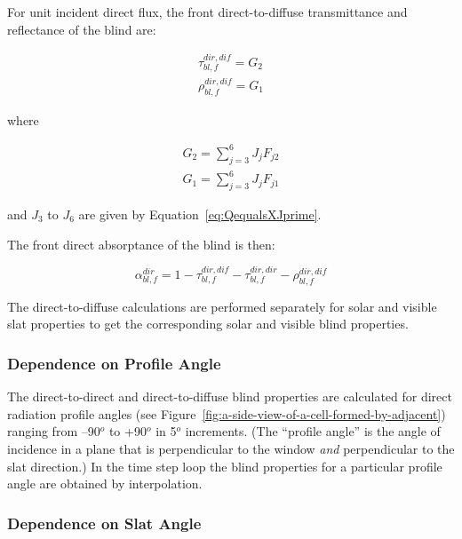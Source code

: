 For unit incident direct flux, the front direct-to-diffuse transmittance and reflectance of the blind are:

\begin{equation}
  \begin{array}{l}
    \tau_{bl,f}^{dir,dif} = {G_2} \\
    \rho_{bl,f}^{dir,dif} = {G_1}
  \end{array}
\end{equation}

where

\begin{equation}
  \begin{array}{l}
    G_2 = \sum_{j = 3}^6 J_j F_{j2} \\
    G_1 = \sum_{j = 3}^6 J_j F_{j1}
  \end{array}
\end{equation}

and \({J_3}\) to \({J_6}\) are given by Equation~\ref{eq:QequalsXJprime}.

The front direct absorptance of the blind is then:

\begin{equation}
\alpha_{bl,f}^{dir} = 1 - \tau_{bl,f}^{dir,dif} - \tau_{bl,f}^{dir,dir} - \rho_{bl,f}^{dir,dif}
\end{equation}

The direct-to-diffuse calculations are performed separately for solar and visible slat properties to get the corresponding solar and visible blind properties.

\subsubsection{Dependence on Profile Angle}\label{dependence-on-profile-angle}

The direct-to-direct and direct-to-diffuse blind properties are calculated for direct radiation profile angles (see Figure~\ref{fig:a-side-view-of-a-cell-formed-by-adjacent}) ranging from --90\(^{o}\) to +90\(^{o}\) in 5\(^{o}\) increments. (The ``profile angle'' is the angle of incidence in a plane that is perpendicular to the window \emph{and} perpendicular to the slat direction.) In the time step loop the blind properties for a particular profile angle are obtained by interpolation.

\subsubsection{Dependence on Slat Angle}\label{dependence-on-slat-angle}


